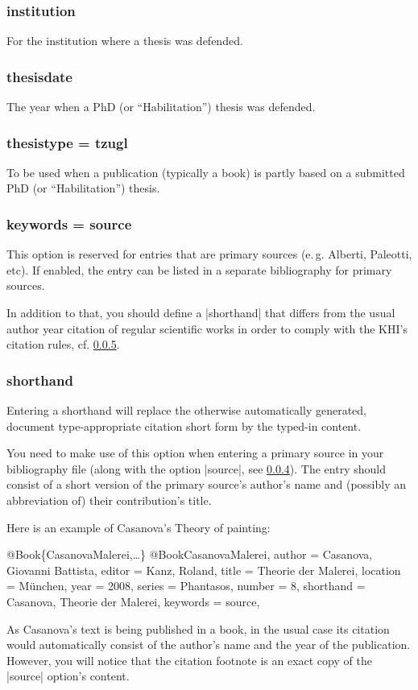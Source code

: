 \documentclass[a4paper,
10pt,
ngerman,
english
]{ltxdoc}
\begin{document}
\subsubsection{institution}
For the institution where a thesis was defended.

\subsubsection{thesisdate}
The year when a PhD (or \enquote{Habilitation}) thesis was defended.

\subsubsection{thesistype = tzugl}
To be used when a publication (typically a book) is partly based on a submitted PhD (or \enquote{Habilitation}) thesis.

\subsubsection{keywords = source}\label{sec:source}
This option is reserved for entries that are primary sources (e.\,g. Alberti, Paleotti, etc). %
If enabled, the entry can be listed in a separate bibliography for primary sources.

In addition to that, you should define a |shorthand| that differs from the usual author year citation of regular scientific works in order to comply with the KHI's citation rules, cf. \cref{sec:shorthand}.

\subsubsection{shorthand}\label{sec:shorthand}
Entering a shorthand will replace the otherwise automatically generated, document type-appropriate citation short form by the typed-in content.

You need to make use of this option when entering a primary source in your bibliography file (along with the option |source|, see \cref{sec:source}). The entry should consist of a short version of the primary source's author's name and (possibly an abbreviation of) their contribution's title.

Here is an example of Casanova's Theory of painting:
\begin{bibexample}[label=CasanovaMalerei]{{@}Book\{CasanovaMalerei,…\}}
@Book{CasanovaMalerei,
  author    = {Casanova, Giovanni Battista},
  editor    = {Kanz, Roland},
  title     = {Theorie der Malerei},
  location  = {München},
  year      = {2008},
  series    = {Phantasos},
  number    = {8},
  shorthand = {Casanova, Theorie der Malerei},
  keywords  = {source},
}
\end{bibexample}
As Casanova's text is being published in a book, in the usual case its citation would automatically consist of the author's name and the year of the publication.
However, you will notice that the citation footnote is an exact copy of the |source| option's content.
\end{document}
